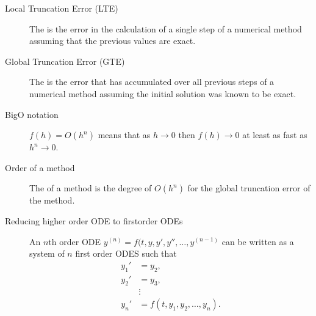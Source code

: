 \documentclass[letterpaper,10pt,english]{jupyterBook}
\begin{document}
\begin{description}
\item[{Local Truncation Error (LTE)\label{\detokenize{8_Appendices/8.0_Cheat_sheet:term-Local-Truncation-Error-LTE}}}] \leavevmode
\sphinxAtStartPar
The {\hyperref[\detokenize{1_IVPs/1.3_Error_Analysis:local-truncation-error-section}]{}} is the error in the calculation of a single step of a numerical method assuming that the previous values are exact.

\item[{Global Truncation Error (GTE)\label{\detokenize{8_Appendices/8.0_Cheat_sheet:term-Global-Truncation-Error-GTE}}}] \leavevmode
\sphinxAtStartPar
The {\hyperref[\detokenize{1_IVPs/1.3_Error_Analysis:global-truncation-error-section}]{}} is the error that has accumulated over all previous steps of a numerical method assuming the initial solution was known to be exact.

\item[{Big\sphinxhyphen{}O notation\label{\detokenize{8_Appendices/8.0_Cheat_sheet:term-Big-O-notation}}}] \leavevmode
\sphinxAtStartPar
\(f(h) = O(h^n)\) means that as \(h \to 0\) then \(f(h) \to 0\) at least as fast as \(h^n \to 0\).

\item[{Order of a method\label{\detokenize{8_Appendices/8.0_Cheat_sheet:term-Order-of-a-method}}}] \leavevmode
\sphinxAtStartPar
The {\hyperref[\detokenize{1_IVPs/1.3_Error_Analysis:global-truncation-error-section}]{}} of a method is the degree of \(O(h^n)\) for the global truncation error of the method.

\item[{Reducing higher order ODE to first\sphinxhyphen{}order ODEs\label{\detokenize{8_Appendices/8.0_Cheat_sheet:term-Reducing-higher-order-ODE-to-first-order-ODEs}}}] \leavevmode
\sphinxAtStartPar
An \(n\)th order ODE \(y^{(n)} = f(t, y, y', y'', \ldots, y^{(n-1)}\) can be written as a system of \(n\) first order ODES such that
\begin{align*}
    y_1' &= y_2, \\
    y_2' &= y_3, \\
    & \vdots \\
    y_n' &= f(t, y_1, y_2, \ldots, y_n).
\end{align*}
\end{description}
\end{document}

